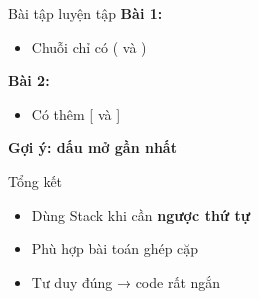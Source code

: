 \documentclass[aspectratio=169]{beamer}
\begin{document}
\begin{frame}{Bài tập luyện tập}
\Large
\textbf{Bài 1:}
\begin{itemize}
    \item Chuỗi chỉ có ( và )
\end{itemize}

\vspace{10pt}
\textbf{Bài 2:}
\begin{itemize}
    \item Có thêm [ và ]
\end{itemize}

\vspace{12pt}
\centering
\textbf{Gợi ý: dấu mở gần nhất}
\end{frame}

\begin{frame}{Tổng kết}
\Large
\begin{itemize}
    \item Dùng Stack khi cần \textbf{ngược thứ tự}
    \item Phù hợp bài toán ghép cặp
    \item Tư duy đúng → code rất ngắn
\end{itemize}
\end{frame}
\end{document}
